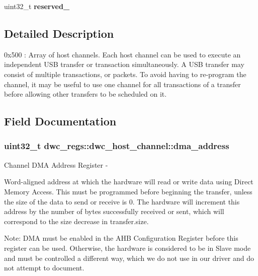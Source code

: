 \begin{DoxyCompactItemize}
\item 
\hypertarget{structdwc__regs_1_1dwc__host__channel_a6d6a9b193d118981d757576c398f51e3}{uint32\-\_\-t {\bfseries reserved\-\_}}\label{structdwc__regs_1_1dwc__host__channel_a6d6a9b193d118981d757576c398f51e3}

\end{DoxyCompactItemize}


\subsection{Detailed Description}
0x500 \-: Array of host channels. Each host channel can be used to execute an independent U\-S\-B transfer or transaction simultaneously. A U\-S\-B transfer may consist of multiple transactions, or packets. To avoid having to re-\/program the channel, it may be useful to use one channel for all transactions of a transfer before allowing other transfers to be scheduled on it. 

\subsection{Field Documentation}
\hypertarget{structdwc__regs_1_1dwc__host__channel_a2c8460c60568d37d2019340802d34637}{
\subsubsection[{dma\-\_\-address}]{\setlength{\rightskip}{0pt plus 5cm}uint32\-\_\-t dwc\-\_\-regs\-::dwc\-\_\-host\-\_\-channel\-::dma\-\_\-address}}\label{structdwc__regs_1_1dwc__host__channel_a2c8460c60568d37d2019340802d34637}
Channel D\-M\-A Address Register -\/

Word-\/aligned address at which the hardware will read or write data using Direct Memory Access. This must be programmed before beginning the transfer, unless the size of the data to send or receive is 0. The hardware will increment this address by the number of bytes successfully received or sent, which will correspond to the size decrease in transfer.\-size.

Note\-: D\-M\-A must be enabled in the A\-H\-B Configuration Register before this register can be used. Otherwise, the hardware is considered to be in Slave mode and must be controlled a different way, which we do not use in our driver and do not attempt to document.


